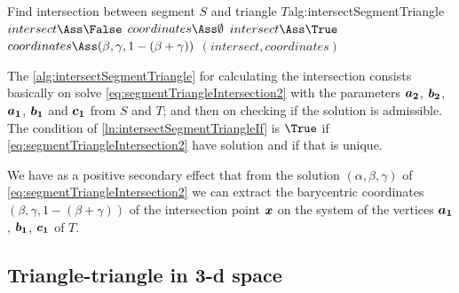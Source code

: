 \documentclass[dissertation.tex]{subfiles}
\begin{document}
\begin{algo}{Find intersection between segment $S$ and triangle $T$}{alg:intersectSegmentTriangle}
  \State $intersect\Ass\False$
  \State $coordinates\Ass\emptyset$
  \label{ln:intersectSegmentTriangleIf}
  \State $intersect\Ass\True$
  \State $coordinates\Ass(\beta, \gamma, 1-(\beta+\gamma))$
  \EndIf
  \EndIf
  \State\Return $(intersect, coordinates)$
  \EndFunction
\end{algo}
The \cref{alg:intersectSegmentTriangle} for calculating the
intersection consists basically on solve
\cref{eq:segmentTriangleIntersection2} with the parameters $\boldsymbol{a_2}$,
$\boldsymbol{b_2}$, $\boldsymbol{a_1}$, $\boldsymbol{b_1}$ and $\boldsymbol{c_1}$ from $S$ and $T$;
and then on checking if the solution is admissible. The condition of
\cref{ln:intersectSegmentTriangleIf} is $\True$ if
\cref{eq:segmentTriangleIntersection2} have solution and if that
is unique.

We have as a positive secondary effect that from the solution
$(\alpha,\beta,\gamma)$ of \cref{eq:segmentTriangleIntersection2} we
can extract the barycentric coordinates $(\beta, \gamma,
1-(\beta+\gamma))$ of the intersection point $\boldsymbol{x}$ on the system of
the vertices $\boldsymbol{a_1}$, $\boldsymbol{b_1}$, $\boldsymbol{c_1}$ of $T$.

\subsection{Triangle-triangle in 3-d space}\label{sec:intersectionsTriangleTriangle}
\end{document}
